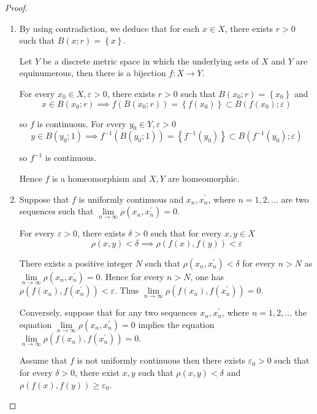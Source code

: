 \begin{proof}
	\begin{enumerate}[label={(\alph*)}]
		\item By using contradiction, we deduce that for each \( x \in X \), there exists \( r > 0 \) such that \( B(x; r) = \left\{ x \right\} \).

		      Let \( Y \) be a discrete metric space in which the underlying sets of \( X \) and \( Y \) are equinumerous, then there is a bijection \( f: X \to Y \).

		      For every \( x_{0} \in X, \varepsilon > 0 \), there exists \( r > 0 \) such that \( B(x_{0}; r) = \left\{ x_{0} \right\} \) and
		      \[
			      x \in B(x_{0}; r) \implies f(B(x_{0}; r)) = \left\{ f(x_{0}) \right\} \subset B(f(x_{0}); \varepsilon)
		      \]

		      so \( f \) is continuous. For every \( y_{0} \in Y, \varepsilon > 0 \)
		      \[
			      y \in B(y_{0}; 1) \implies f^{-1}(B(y_{0}; 1)) = \left\{ f^{-1}(y_{0}) \right\} \subset B(f^{-1}(y_{0}); \varepsilon)
		      \]

		      so \( f^{-1} \) is continuous.

		      Hence \( f \) is a homeomorphism and \( X, Y \) are homeomorphic.
		\item Suppose that \( f \) is uniformly continuous and \( x_{n}, x^{\prime}_{n} \), where \( n = 1, 2, \ldots \) are two sequences such that \( \lim\limits_{n\to\infty} \rho(x_{n}, x^{\prime}_{n}) = 0 \).

		      For every \( \varepsilon > 0 \), there exists \( \delta > 0 \) such that for every \( x, y \in X \)
		      \[
			      \rho(x, y) < \delta \implies \rho(f(x), f(y)) < \varepsilon
		      \]

		      There exists a positive integer \( N \) such that \( \rho(x_{n}, x^{\prime}_{n}) < \delta \) for every \( n > N \) as \( \lim\limits_{n\to\infty} \rho(x_{n}, x^{\prime}_{n}) = 0 \). Hence for every \( n > N \), one has \( \rho(f(x_{n}), f(x^{\prime}_{n})) < \varepsilon \). Thus \( \lim\limits_{n\to\infty} \rho(f(x_{n}), f(x^{\prime}_{n})) = 0 \).

		      Conversely, suppose that for any two sequences \( x_{n}, x^{\prime}_{n} \), where \( n = 1, 2, \ldots \) the equation \( \lim\limits_{n\to\infty} \rho(x_{n}, x^{\prime}_{n}) = 0 \) implies the equation \( \lim\limits_{n\to\infty} \rho(f(x_{n}), f(x^{\prime}_{n})) = 0 \).

		      Assume that \( f \) is not uniformly continuous then there exists \( \varepsilon_{0} > 0 \) such that for every \( \delta > 0 \), there exist \( x, y \) such that \( \rho(x, y) < \delta \) and \( \rho(f(x), f(y)) \ge \varepsilon_{0} \).


\end{enumerate}
\end{proof}
